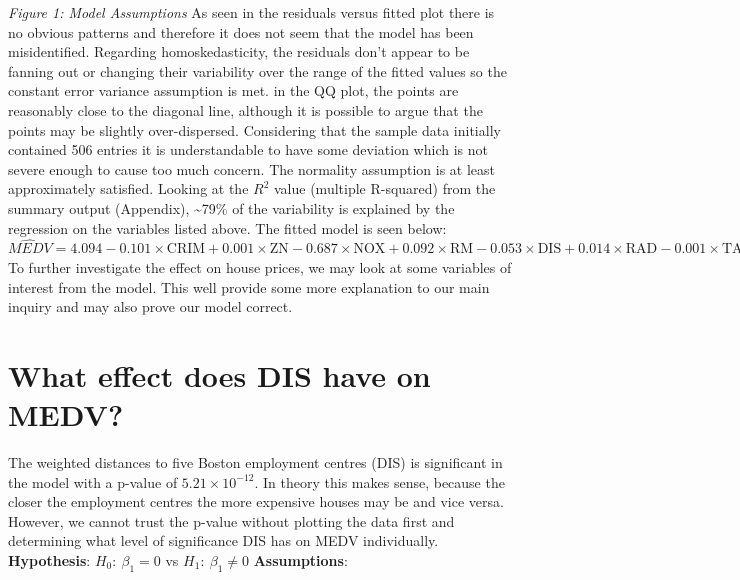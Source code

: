 \documentclass[a4paper,9pt,twocolumn,twoside,]{pinp}
\begin{document}
\emph{Figure 1: Model Assumptions} \newline \newline As seen in the
residuals versus fitted plot there is no obvious patterns and therefore
it does not seem that the model has been misidentified. Regarding
homoskedasticity, the residuals don't appear to be fanning out or
changing their variability over the range of the fitted values so the
constant error variance assumption is met. in the QQ plot, the points
are reasonably close to the diagonal line, although it is possible to
argue that the points may be slightly over-dispersed. Considering that
the sample data initially contained 506 entries it is understandable to
have some deviation which is not severe enough to cause too much
concern. The normality assumption is at least approximately satisfied.
Looking at the \(R^2\) value (multiple R-squared) from the summary
output (Appendix), \textasciitilde79\% of the variability is explained
by the regression on the variables listed above. The fitted model is
seen below: \newline \newline
\(\widehat{MEDV} = 4.094 - 0.101\times\text{CRIM} + 0.001\times\text{ZN} - 0.687\times\text{NOX} + 0.092\times\text{RM} - 0.053\times\text{DIS} + 0.014\times\text{RAD} - 0.001\times\text{TAX} - 0.039\times\text{PTRATIO} + 0.001\times\text{B} - 0.029\times\text{LSTAT}\)
\newline \newline To further investigate the effect on house prices, we
may look at some variables of interest from the model. This well provide
some more explanation to our main inquiry and may also prove our model
correct.

\hypertarget{what-effect-does-dis-have-on-medv}{%
\section{What effect does DIS have on
MEDV?}\label{what-effect-does-dis-have-on-medv}}

The weighted distances to five Boston employment centres (DIS) is
significant in the model with a p-value of \(5.21 \times 10^{-12}\). In
theory this makes sense, because the closer the employment centres the
more expensive houses may be and vice versa. However, we cannot trust
the p-value without plotting the data first and determining what level
of significance DIS has on MEDV individually. \newline \newline
\textbf{Hypothesis}: \(H_0\colon\ \beta_1 = 0\) vs
\(H_1\colon\ \beta_1 \neq 0\) \newline \textbf{Assumptions}:
\end{document}
